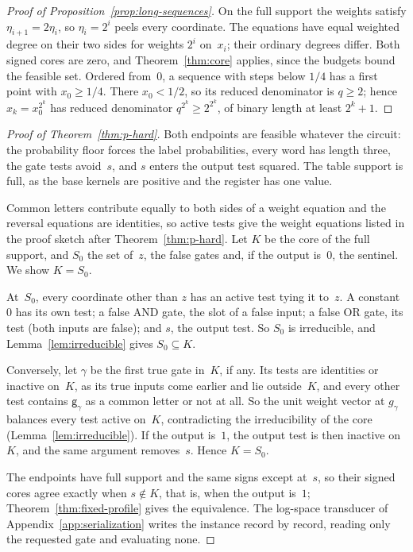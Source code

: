 \begin{proof}[Proof of Proposition~\ref{prop:long-sequences}]
On the full support the weights satisfy $\eta_{i+1}=2\eta_i$, so
$\eta_i=2^i$ peels every coordinate. The equations have equal weighted
degree on their two sides for weights $2^i$ on~$x_i$; their ordinary
degrees differ. Both signed cores are zero, and
Theorem~\ref{thm:core} applies, since the budgets bound the feasible set.
Ordered from~$0$, a sequence with steps below $1/4$ has a first point with
$x_0\ge1/4$. There $x_0<1/2$, so its reduced denominator is $q\ge2$; hence
$x_k=x_0^{2^k}$ has reduced denominator $q^{2^k}\ge2^{2^k}$, of binary
length at least $2^k+1$.
\end{proof}

\begin{proof}[Proof of Theorem~\ref{thm:p-hard}]
Both endpoints are feasible whatever the circuit: the probability floor
forces the label probabilities, every word has length three, the gate tests avoid~$s$,
and $s$ enters the output test squared. The table support is full, as the
base kernels are positive and the register has one value.

Common letters contribute equally to both sides of a weight equation and
the reversal equations are identities, so active tests give the weight
equations listed in the proof sketch after Theorem~\ref{thm:p-hard}. Let
$K$ be the core of the full support, and $S_0$ the set of~$z$, the false
gates and, if the output is~$0$, the sentinel. We show $K=S_0$.

At~$S_0$, every coordinate other than $z$ has an active test tying it
to~$z$. A constant~$0$ has its own test; a false AND gate, the slot of a
false input; a false OR gate, its test (both inputs are false); and $s$,
the output test. So $S_0$ is irreducible, and Lemma~\ref{lem:irreducible}
gives $S_0\subseteq K$.

Conversely, let $\gamma$ be the first true gate in~$K$, if any. Its tests
are identities or inactive on~$K$, as its true inputs come earlier and lie
outside~$K$, and every other test contains $\mathsf g_\gamma$ as a common
letter or not at all. So the unit weight vector at $g_\gamma$ balances
every test active on~$K$, contradicting the irreducibility of the core
(Lemma~\ref{lem:irreducible}). If the output is~$1$, the output test is
then inactive on~$K$, and the same argument removes~$s$. Hence $K=S_0$.

The endpoints have full support and the same signs except at~$s$, so
their signed cores agree exactly when $s\notin K$, that is, when the
output is~$1$; Theorem~\ref{thm:fixed-profile} gives the equivalence.
The log-space transducer of Appendix~\ref{app:serialization} writes the
instance record by record, reading only the requested gate and evaluating
none.
\end{proof}

